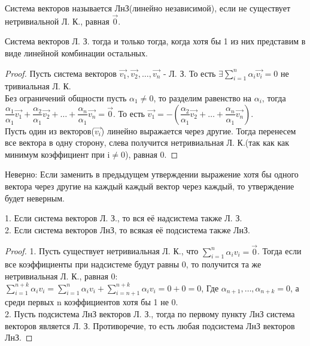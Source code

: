 \begin{definition}
	Система векторов называется ЛнЗ(линейно независимой), если не существует нетривиальной Л. К., равная $\vec{0}$.
\end{definition}
\begin{proposition}
	Система векторов Л. З. тогда и только тогда, когда хотя бы 1 из них представим в виде линейной комбинации остальных.
\end{proposition}
\begin{proof}
	Пусть система векторов \(\vec{v_1}, \vec{v_2}, \ldots, \vec{v_n}\) - Л. З. То есть \(\exists \sum_{i=1}^{n}\alpha_i\vec{v_i} = 0\) не тривиальная Л. К. \\
	Без ограничений общности пусть $\alpha_1\ne0$, то разделим равенство на $\alpha_i$, тогда \(\dfrac{\alpha_1}{\alpha_1}\vec{v_1}+\dfrac{\alpha_2}{\alpha_1}\vec{v_2}+
	\ldots+\dfrac{\alpha_n}{\alpha_1}\vec{v_n} = \vec{0}\). То есть \(\vec{v_1} = - (\dfrac{\alpha_2}{\alpha_1}\vec{v_2}+\ldots+\dfrac{\alpha_n}{\alpha_1}\vec{v_n})\). \\
	Пусть один из векторов($\vec{v_i}$) линейно выражается через другие. Тогда перенесем все вектора в одну сторону, слева получится нетривиальная Л. К.(так как как минимум коэффициент при i$\ne$0), равная 0.
\end{proof}
\begin{note}
	Неверно: Если заменить в предыдущем утверждении выражение хотя бы одного вектора через другие на каждый каждый вектор через каждый, то утверждение будет неверным. 
\end{note}
\begin{proposition}
	1. Если система векторов Л. З., то вся её надсистема также Л. З. \\
	2. Если система векторов ЛнЗ, то всякая её подсистема также ЛнЗ.
\end{proposition}
\begin{proof}
	1. Пусть существует нетривиальная Л. К., что \(\sum_{i=1}^{n}\alpha_iv_i = \vec{0}\). Тогда если все коэффициенты при надсистеме будут равны 0, то получится та же нетривиальная Л. К., равная 0: \(\sum_{i=1}^{n+k}\alpha_iv_i = \sum_{i=1}^{n}\alpha_iv_i + \sum_{i=n+1}^{n+k}\alpha_iv_i = 0 + 0 = 0\), Где \(\alpha_{n+1}, \ldots, \alpha_{n+k} = 0\), а среди первых n коэффициентов хотя бы 1 не 0. \\
	2. Пусть подсистема ЛнЗ векторов Л. З., тогда по первому пункту ЛнЗ система векторов является Л. З. Противоречие, то есть любая подсистема ЛнЗ векторов ЛнЗ.
\end{proof}
